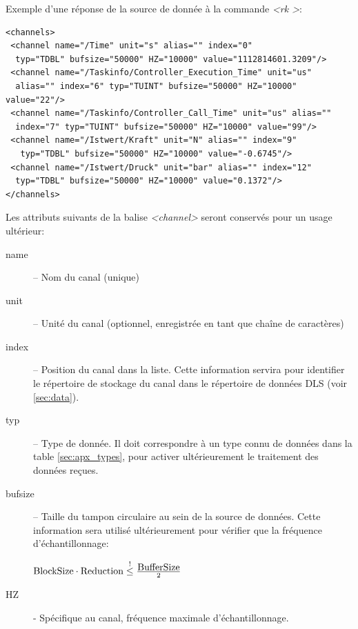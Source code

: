 \documentclass[a4paper,12pt,BCOR6mm,bibtotoc,idxtotoc]{scrbook}
\begin{document}
Exemple d'une r\'eponse de la source de donn\'ee \`a la commande
\textit{\textless rk \textgreater}:

\begin{lstlisting}[basicstyle=\ttfamily\scriptsize]
<channels>
 <channel name="/Time" unit="s" alias="" index="0"
  typ="TDBL" bufsize="50000" HZ="10000" value="1112814601.3209"/>
 <channel name="/Taskinfo/Controller_Execution_Time" unit="us"
  alias="" index="6" typ="TUINT" bufsize="50000" HZ="10000" value="22"/>
 <channel name="/Taskinfo/Controller_Call_Time" unit="us" alias=""
  index="7" typ="TUINT" bufsize="50000" HZ="10000" value="99"/>
 <channel name="/Istwert/Kraft" unit="N" alias="" index="9"
   typ="TDBL" bufsize="50000" HZ="10000" value="-0.6745"/>
 <channel name="/Istwert/Druck" unit="bar" alias="" index="12"
  typ="TDBL" bufsize="50000" HZ="10000" value="0.1372"/>
</channels>
\end{lstlisting}

Les attributs suivants de la balise \textit{\textless channel\textgreater} seront
conserv\'es pour un usage ult\'erieur:
\begin{description}

\item[name] -- Nom du canal (unique)

\item[unit] -- Unit\'e du canal (optionnel, enregistr\'ee en tant que
  cha\^ine de caract\`eres)

\item[index] -- Position du canal dans la liste.  Cette information
  servira pour identifier le r\'epertoire de stockage du canal dans le
  r\'epertoire de donn\'ees DLS (voir \autoref{sec:data}).

\item[typ] -- Type de donn\'ee. Il doit correspondre \`a un type connu
  de donn\'ees dans la table \autoref{sec:apx_types}, pour activer
  ult\'erieurement le traitement des donn\'ees re\c cues.

\item[bufsize] -- Taille du tampon circulaire au sein de la source de donn\'ees. Cette
  information sera utilis\'e ult\'erieurement pour v\'erifier que la fr\'equence
  d'\'echantillonnage:

$ \hbox{BlockSize} \cdot \hbox{Reduction} \stackrel{!}{\le} \frac{\hbox{BufferSize}}{2} $

\item[HZ] - Sp\'ecifique au canal, fr\'equence maximale d'\'echantillonnage.

\end{description}
\end{document}
